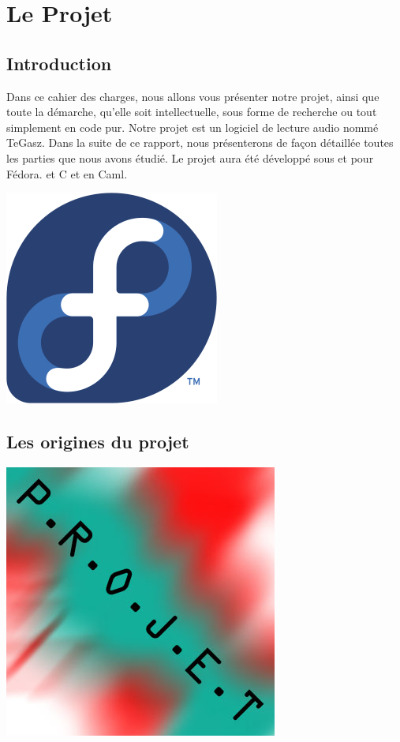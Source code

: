 \documentclass{report}
\begin{document}
\tableofcontents

\chapter{Le Projet}
	\section{Introduction}
Dans ce cahier des charges, nous allons vous présenter notre projet, ainsi que toute la démarche, qu'elle soit intellectuelle, sous forme de recherche ou tout simplement en code pur.
Notre projet est un logiciel de lecture audio nommé TeGasz. Dans la suite de ce rapport, nous présenterons de façon détaillée toutes les parties que nous avons étudié. Le projet aura été développé sous et pour Fédora. et C et en Caml.

\begin{center}
\includegraphics[scale = 0.2]{logo_fedo.png}
\end{center}

	\section{Les origines du projet}

\begin{center}
\includegraphics[scale= 0.3]{./name.jpg}\\[1cm]  
\end{center}
\end{document}
